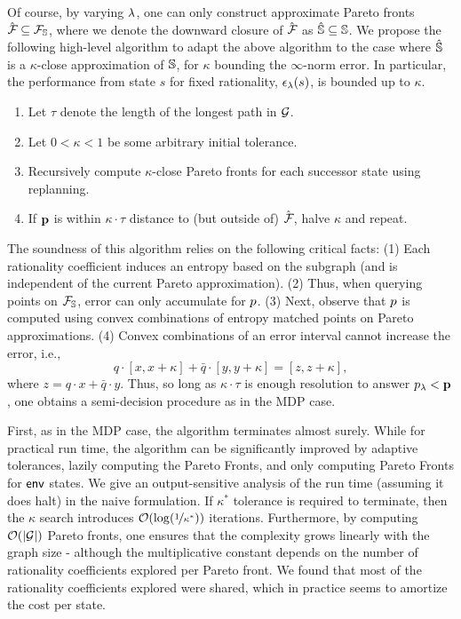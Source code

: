 Of course, by varying $\lambda$, one can only construct approximate
Pareto fronts $\hat{\mathcal{F}_{}} \subseteq \mathcal{F}_{\mathbb{S}}$, where we denote the downward closure of $\hat{\mathcal{F}_{}}$ as $\hat{\mathbb{S}} \subseteq \mathbb{S}$.
We propose the following high-level algorithm to
adapt the above algorithm to the case where
$\hat{\mathbb{S}}$ is a $\kappa$-close approximation of $\mathbb{S}$,
for $\kappa$ bounding the $\infty$-norm error. In particular, the
performance from state $s$ for fixed rationality,
$\epsilon_\lambda(s)$, is bounded up to $\kappa$.
\begin{mdframed}
\begin{enumerate}
\item Let $\tau$ denote the length of the longest path in $\mathcal{G}$.
\item Let $0 < \kappa < 1$ be some arbitrary initial tolerance.
\item Recursively compute $\kappa$-close Pareto fronts for each successor state using replanning.
\item If $\mathbf{p}$ is within $\kappa\cdot \tau$ distance to (but outside of) $\hat{\mathcal{F}_{}}$,
  halve $\kappa$ and repeat.
\end{enumerate}  
\end{mdframed}
The soundness of this algorithm relies on the following critical
facts: (1) Each rationality coefficient induces an entropy based on
the subgraph (and is independent of the current Pareto
approximation). (2) Thus, when querying points on
$\mathcal{F}_{\mathbb{S}}$, error can only accumulate for $p$. (3) Next,
observe that $p$ is computed using convex combinations of entropy
matched points on Pareto approximations. (4) Convex combinations of an error interval cannot
increase the error, i.e.,
\begin{equation}
  q\cdot[x, x + \kappa] + \bar{q}\cdot[y, y + \kappa] = [z, z + \kappa],
\end{equation}
where $z = q\cdot x + \bar{q}\cdot y$.
Thus, so long as $\kappa\cdot\tau$ is enough resolution to answer $p_\lambda <
\mathbf{p}$, one obtains a semi-decision procedure as in the MDP
case.

First, as in the MDP case, the algorithm terminates almost surely.
While for practical run time, the algorithm can be significantly improved by adaptive
tolerances, lazily computing the Pareto Fronts, and only computing
Pareto Fronts for $\mathsf{env}$ states.
We give an output-sensitive analysis of the run time (assuming it does halt) in the naive formulation.
 If $\kappa^*$ tolerance is required to terminate,
then the $\kappa$ search introduces $\mathcal{O}(\log(\nicefrac{1}{\kappa^*}))$
iterations. Furthermore, by computing $\mathcal{O}(|\mathcal{G}|)$ Pareto fronts, one ensures that the complexity grows linearly with the graph
size - although the multiplicative constant depends on the number of
rationality coefficients explored per Pareto front. We found that most
of the rationality coefficients explored were shared, which in
practice seems to amortize the cost per state. 

